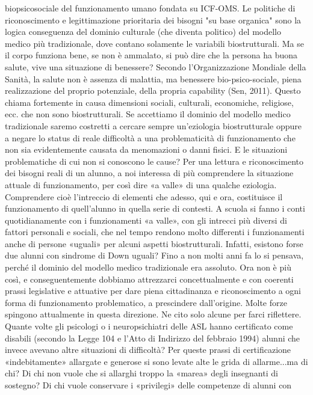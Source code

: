 biopsicosociale del funzionamento umano fondata su ICF-OMS.
Le politiche di riconoscimento e legittimazione prioritaria dei bisogni "su base organica" sono
la logica conseguenza del dominio culturale (che diventa politico) del modello medico più
tradizionale, dove contano solamente le variabili biostrutturali. Ma se il corpo funziona bene, se
non è ammalato, si può dire che la persona ha buona salute, vive una situazione di benessere?
Secondo l’Organizzazione Mondiale della Sanità, la salute non è assenza di malattia, ma
benessere bio-psico-sociale, piena realizzazione del proprio potenziale, della propria capability
(Sen, 2011). Questo chiama fortemente in causa dimensioni sociali, culturali, economiche,
religiose, ecc. che non sono biostrutturali. Se accettiamo il dominio del modello medico
tradizionale saremo costretti a cercare sempre un’eziologia biostrutturale oppure a negare lo
status di reale difficoltà a una problematicità di funzionamento che non sia evidentemente causata
da menomazioni o danni fisici. E le situazioni problematiche di cui non si conoscono le cause?
Per una lettura e riconoscimento dei bisogni reali di un alunno, a noi interessa di più
comprendere la situazione attuale di funzionamento, per così dire «a valle» di una qualche
eziologia. Comprendere cioè l’intreccio di elementi che adesso, qui e ora, costituisce il
funzionamento di quell’alunno in quella serie di contesti.
A scuola si fanno i conti quotidianamente con i funzionamenti «a valle», con gli intrecci più
diversi di fattori personali e sociali, che nel tempo rendono molto differenti i funzionamenti anche
di persone «uguali» per alcuni aspetti biostrutturali.
Infatti, esistono forse due alunni con sindrome di Down uguali? Fino a non molti anni fa lo si
pensava, perché il dominio del modello medico tradizionale era assoluto. Ora non è più così, e
conseguentemente dobbiamo attrezzarci concettualmente e con coerenti prassi legislative e
attuative per dare piena cittadinanza e riconoscimento a ogni forma di funzionamento
problematico, a prescindere dall’origine.
Molte forze spingono attualmente in questa direzione. Ne cito solo alcune per farci riflettere.
Quante volte gli psicologi o i neuropsichiatri delle ASL hanno certificato come disabili (secondo
la Legge 104 e l’Atto di Indirizzo del febbraio 1994) alunni che invece avevano altre situazioni di
difficoltà? Per queste prassi di certificazione «indebitamente» allargate e generose si sono levate
alte le grida di allarme...ma di chi? Di chi non vuole che si allarghi troppo la «marea» degli
insegnanti di sostegno? Di chi vuole conservare i «privilegi» delle competenze di alunni con
